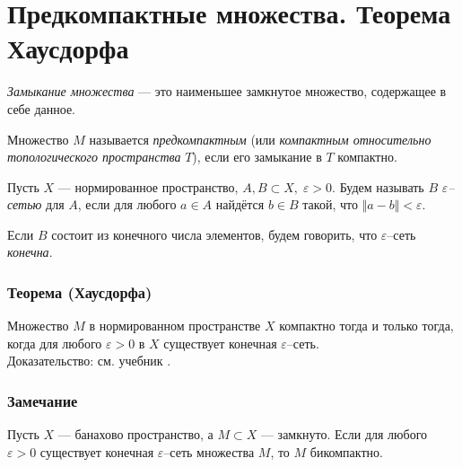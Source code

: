 \section{Предкомпактные множества. Теорема Хаусдорфа}
\label{sec:q-35}

\textit{Замыкание множества} --- это наименьшее замкнутое множество, содержащее в себе данное.

Множество $M$ называется \textit{предкомпактным} (или \textit{компактным относительно топологического пространства} $T$), если его замыкание в $T$ компактно.

Пусть $X$ --- нормированное пространство, $A, B \subset X, \; \varepsilon > 0$. Будем называть $B$ \textit{$\varepsilon$--сетью} для $A$, если для любого $a \in A$ найдётся $b \in B$ такой, что $\Vert a - b\Vert < \varepsilon$.

Если $B$ состоит из конечного числа элементов, будем говорить, что $\varepsilon$--сеть \textit{конечна}.

\subsubsection*{Теорема (Хаусдорфа)}
Множество $M$ в нормированном пространстве $X$ компактно тогда и только тогда, когда для любого $\varepsilon > 0$ в $X$ существует конечная $\varepsilon$--сеть.\\
Доказательство: см. учебник \cite[с.~195]{trenogin}.

\subsubsection*{Замечание}
Пусть $X$ --- банахово пространство, а $M \subset X$ --- замкнуто. Если для любого $\varepsilon > 0$ существует конечная $\varepsilon$--сеть множества $M$, то $M$ бикомпактно.